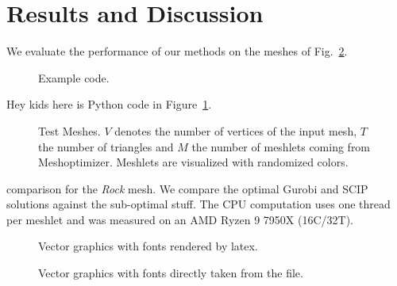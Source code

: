 \section{Results and Discussion}\label{Sec:Evaluation}

We evaluate the performance of our methods on the meshes of Fig.~\ref{fig:meshes}.
\begin{figure}
%
\caption{Example code.}\label{Code:Python}%
\end{figure}
    
Hey kids here is Python code in Figure~\ref{Code:Python}.

\begin{figure}
    \centering%
    \def\svgwidth{\textwidth}%
    \fontsize{6pt}{5pt}\selectfont%
    \caption{Test Meshes.
    $V$ denotes the number of vertices of the input mesh, $T$ the number of triangles and $M$ the number of meshlets coming from Meshoptimizer.
    Meshlets are visualized with randomized colors.
    }\label{fig:meshes}%
\end{figure}%

\begin{table}
    \caption{    
    comparison for the \textit{Rock} mesh.
    We compare the optimal Gurobi and SCIP solutions against the sub-optimal stuff.
    The CPU computation uses one thread per meshlet and was measured on an AMD Ryzen 9 7950X (16C/32T).    
    }\label{tab:StripifyTable}    
    {
    \centering    
    
    }
\end{table}


\begin{figure}
    
    \caption{Vector graphics with fonts rendered by latex.}\label{fig:latexfonts}
\end{figure}

\begin{figure}
    
    \caption{Vector graphics with fonts directly taken from the file.}\label{fig:svgfonts}
\end{figure}

